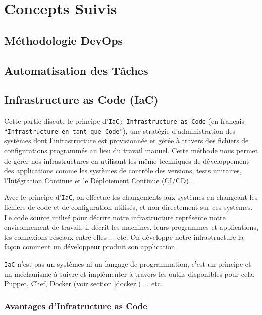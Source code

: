 \section{Concepts Suivis}

\subsection{Méthodologie DevOps}

\subsection{Automatisation des Tâches}

\subsection{Infrastructure as Code (IaC)}
Cette partie discute le principe d'\texttt{IaC; Infrastructure as Code}\cite[Chapter~4]{thePracticeOfSystemAndNetworkAdministration} (en français ``\texttt{Infrastructure en tant que Code}''), une stratégie d'administration des systèmes dont l'infrastructure est provisionnée et gérée à travers des fichiers de configurations programmés au lieu du travail manuel. Cette méthode nous permet de gérer nos infrastructures en utilisant les même techniques de développement des applications comme les systèmes de contrôle des versions, tests unitaires, l'Intégration Continue et le Déploiement Continue (CI/CD). 
\newline

Avec le principe d'\texttt{IaC}, on effectue les changements aux systèmes en changeant les fichiers de code et de configuration utilisés, et non directement sur ces systèmes. Le code source utilisé pour décrire notre infrastructure représente notre environnement de travail, il décrit les machines, leurs programmes et applications, les connexions réseaux entre elles ... etc. On développe notre infrastructure la façon comment un développeur produit son application.
\newline

\texttt{IaC} n'est pas un systèmes ni un langage de programmation, c'est un principe et un méchanisme à suivre et implémenter à travers les outils disponibles pour cela; Puppet\cite{puppetWiki}, Chef\cite{chefWiki}, Docker (voir section \ref{docker}) ... etc.

\subsubsection{Avantages d'Infratructure as Code}

